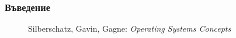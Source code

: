 \documentclass[ignorenonframetext, hyperref=unicode]{beamer}
\begin{document}
\begin{frame}
\frametitle{Въведение}
\begin{figure}[h]
\center
{}
\caption{Silberschatz, Gavin, Gagne: {\em Operating Systems Concepts}}
\end{figure}
\end{frame}
\end{document}

